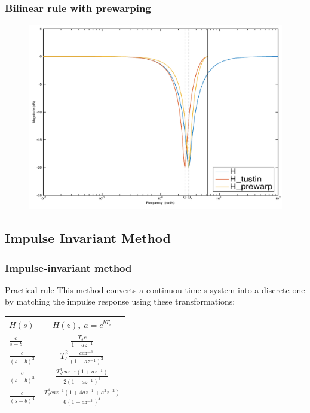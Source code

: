 \begin{frame}
	\frametitle{Bilinear rule with prewarping}
	\vspace{-0.5em}
	\begin{figure}
		\centering
		\includegraphics[width=0.8\linewidth]{Distortion_bode1}
	\end{figure}
\end{frame}

\subsection{Impulse Invariant Method}

\begin{frame}
	\frametitle{Impulse-invariant method}
	\begin{block}{Practical rule}
		This method converts a continuou-time s system into a discrete one by matching the impulse response using these transformations:
		\vspace{-1em}
		\begin{center} 
			\begin{tabular}{ | l | c |} 
			\hline $H(s)$ & $H(z)$, $a = e^{bT_s}$\\ 
			\hline $\frac{c}{s - b}$ & $\frac{T_sc}{1 - az^{-1}}$\\ 
			\hline $\frac{c}{(s - b)^2}$ & $T_s^2 \frac{caz^{-1}}{(1 - az^{-1})^2}$ \\
			\hline $\frac{c}{(s - b)^3}$ & $\frac{T_s^3 caz^{-1}(1 + az^{-1})}{2(1 - az^{-1})^3}$ \\
			\hline $\frac{c}{(s - b)^4}$ & $\frac{T_s^4 caz^{-1}(1 + 4az^{-1} + a^2z^{-2})}{6(1 - az^{-1})^4}$ \\
			\hline 
			\end{tabular}
		\end{center}
	\end{block}
\end{frame}

